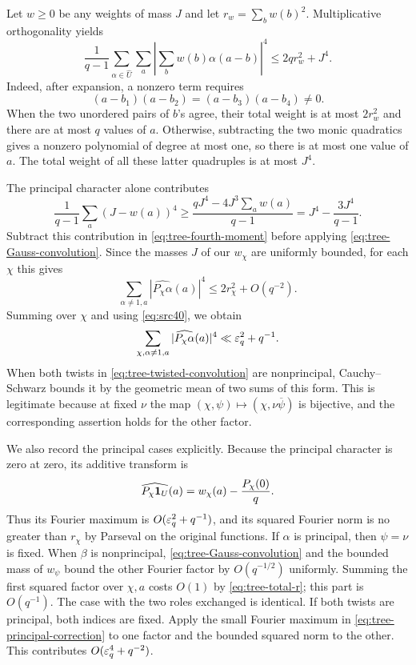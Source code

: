 Let $w\geq0$ be any weights of mass $J$ and let $r_w=\sum_b w(b)^2$.
Multiplicative orthogonality yields
\begin{equation}\label{eq:tree-fourth-moment}
 \frac1{q-1}\sum_{\alpha\in\widehat U}\sum_a
       \left|\sum_b w(b)\alpha(a-b)\right|^4
 \leq 2q r_w^2+J^4.
\end{equation}
Indeed, after expansion, a nonzero term requires
\[
 (a-b_1)(a-b_2)=(a-b_3)(a-b_4)\ne0.
\]
When the two unordered pairs of $b$'s agree, their total weight is
at most $2r_w^2$ and there are at most $q$ values of $a$.  Otherwise,
subtracting the two monic quadratics gives a nonzero polynomial of
degree at most one, so there is at most one value of $a$.  The total
weight of all these latter quadruples is at most $J^4$.

The principal character alone contributes
\[
 \frac1{q-1}\sum_a(J-w(a))^4
 \geq\frac{qJ^4-4J^3\sum_aw(a)}{q-1}
 =J^4-\frac{3J^4}{q-1}.
\]
Subtract this contribution in \eqref{eq:tree-fourth-moment} before
applying \eqref{eq:tree-Gauss-convolution}.  Since the masses $J$ of
our $w_\chi$ are uniformly bounded, for each $\chi$ this gives
\[
 \sum_{\alpha\ne1,a}|\widehat{P_\chi\alpha}(a)|^4
 \leq2r_\chi^2+O(q^{-2}).
\]
Summing over $\chi$ and using \eqref{eq:src40}, we obtain
\begin{equation}\label{eq:tree-all-nonprincipal-fourth}
 \sum_{\chi,\alpha\ne1,a}|\widehat{P_\chi\alpha}(a)|^4
 \ll\varepsilon_q^2+q^{-1}.
\end{equation}
When both twists in \eqref{eq:tree-twisted-convolution} are
nonprincipal, Cauchy--Schwarz bounds it by the geometric mean of two
sums of this form.  This is legitimate because at fixed $\nu$ the map
$(\chi,\psi)\mapsto(\chi,\nu\overline\psi)$ is bijective, and the
corresponding assertion holds for the other factor.

We also record the principal cases explicitly.  Because the principal
character is zero at zero, its additive transform is
\begin{equation}\label{eq:tree-principal-correction}
 \widehat{P_\chi\mathbf 1_U}(a)=w_\chi(a)-\frac{P_\chi(0)}q.
\end{equation}
Thus its Fourier maximum is $O(\varepsilon_q^2+q^{-1})$, and its squared
Fourier norm is no greater than $r_\chi$ by Parseval on the original
functions.  If $\alpha$ is principal, then $\psi=\nu$ is fixed.
When $\beta$ is nonprincipal,
\eqref{eq:tree-Gauss-convolution} and the bounded mass of
$w_\psi$ bound the other Fourier factor by $O(q^{-1/2})$ uniformly.
Summing the first squared factor over $\chi,a$ costs $O(1)$ by
\eqref{eq:tree-total-r}; this part is $O(q^{-1})$.
The case with the two roles exchanged is identical.  If both twists
are principal, both indices are fixed.  Apply the small Fourier
maximum in \eqref{eq:tree-principal-correction} to one factor and
the bounded squared norm to the other.  This contributes
$O(\varepsilon_q^4+q^{-2})$.

